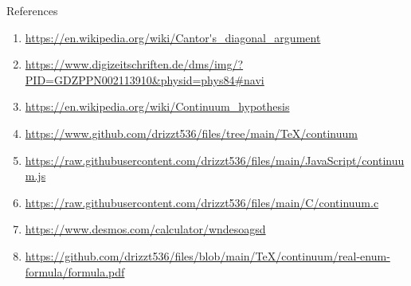 \documentclass[12pt]{article}
\begin{document}
\begin{section}{References}\label{sec:references}
	\begin{enumerate}
		\item\url{https://en.wikipedia.org/wiki/Cantor's\_diagonal\_argument}\\
		\label{ref:diagonal argument}

		\item\url{https://www.digizeitschriften.de/dms/img/?PID=GDZPPN002113910&physid=phys84#navi}\\
		\label{ref:cantor-1891}

		\item\url{https://en.wikipedia.org/wiki/Continuum\_hypothesis}\\
		\label{ref:continuum}

		\item\url{https://www.github.com/drizzt536/files/tree/main/TeX/continuum}\\
		\label{ref:files}

		\item\url{https://raw.githubusercontent.com/drizzt536/files/main/JavaScript/continuum.js}\\
		\label{ref:js-code}

		\item\url{https://raw.githubusercontent.com/drizzt536/files/main/C/continuum.c}\\
		\label{ref:c-code}

		\item\url{https://www.desmos.com/calculator/wndesoagsd}\\
		\label{ref:desmos real-enum}

		\item\url{https://github.com/drizzt536/files/blob/main/TeX/continuum/real-enum-formula/formula.pdf}\\
		\label{ref:pdf real-enum}


\end{enumerate}
\end{section}
\end{document}
